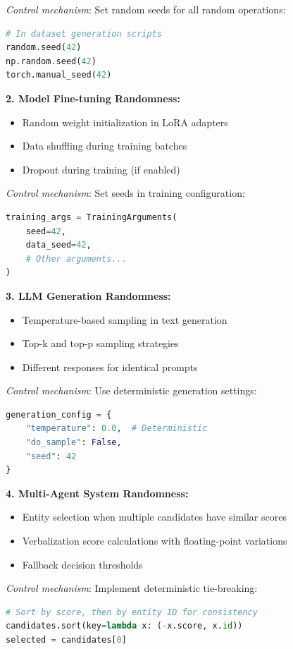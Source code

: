 \textit{Control mechanism}: Set random seeds for all random operations:
\begin{lstlisting}[language=Python]
# In dataset generation scripts
random.seed(42)
np.random.seed(42)
torch.manual_seed(42)
\end{lstlisting}

\textbf{2. Model Fine-tuning Randomness:}
\begin{itemize}
    \item Random weight initialization in LoRA adapters
    \item Data shuffling during training batches
    \item Dropout during training (if enabled)
\end{itemize}

\textit{Control mechanism}: Set seeds in training configuration:
\begin{lstlisting}[language=Python]
training_args = TrainingArguments(
    seed=42,
    data_seed=42,
    # Other arguments...
)
\end{lstlisting}

\textbf{3. LLM Generation Randomness:}
\begin{itemize}
    \item Temperature-based sampling in text generation
    \item Top-k and top-p sampling strategies
    \item Different responses for identical prompts
\end{itemize}

\textit{Control mechanism}: Use deterministic generation settings:
\begin{lstlisting}[language=Python]
generation_config = {
    "temperature": 0.0,  # Deterministic
    "do_sample": False,
    "seed": 42
}
\end{lstlisting}

\textbf{4. Multi-Agent System Randomness:}
\begin{itemize}
    \item Entity selection when multiple candidates have similar scores
    \item Verbalization score calculations with floating-point variations
    \item Fallback decision thresholds
\end{itemize}

\textit{Control mechanism}: Implement deterministic tie-breaking:
\begin{lstlisting}[language=Python]
# Sort by score, then by entity ID for consistency
candidates.sort(key=lambda x: (-x.score, x.id))
selected = candidates[0]
\end{lstlisting}

